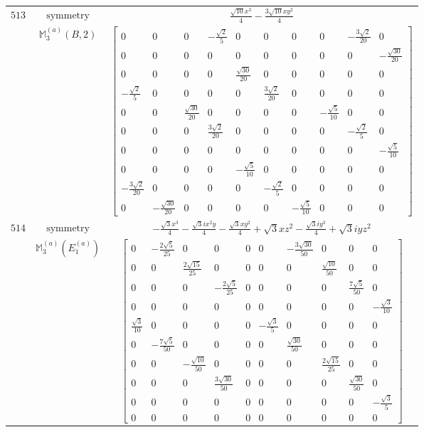 \documentclass[fleqn,8pt,landscape]{jsarticle}
\begin{document}
\begin{longtable}{ccc}
$ 513 $ & $ \text{symmetry} $ & $ \frac{\sqrt{10} x^{3}}{4} - \frac{3 \sqrt{10} x y^{2}}{4} $ \\
$  $ & $ \mathbb{M}_{3}^{(a)}(B,2) $ & $ \begin{bmatrix} 0 & 0 & 0 & - \frac{\sqrt{2}}{5} & 0 & 0 & 0 & 0 & - \frac{3 \sqrt{2}}{20} & 0 \\ 0 & 0 & 0 & 0 & 0 & 0 & 0 & 0 & 0 & - \frac{\sqrt{30}}{20} \\ 0 & 0 & 0 & 0 & \frac{\sqrt{30}}{20} & 0 & 0 & 0 & 0 & 0 \\ - \frac{\sqrt{2}}{5} & 0 & 0 & 0 & 0 & \frac{3 \sqrt{2}}{20} & 0 & 0 & 0 & 0 \\ 0 & 0 & \frac{\sqrt{30}}{20} & 0 & 0 & 0 & 0 & - \frac{\sqrt{5}}{10} & 0 & 0 \\ 0 & 0 & 0 & \frac{3 \sqrt{2}}{20} & 0 & 0 & 0 & 0 & - \frac{\sqrt{2}}{5} & 0 \\ 0 & 0 & 0 & 0 & 0 & 0 & 0 & 0 & 0 & - \frac{\sqrt{5}}{10} \\ 0 & 0 & 0 & 0 & - \frac{\sqrt{5}}{10} & 0 & 0 & 0 & 0 & 0 \\ - \frac{3 \sqrt{2}}{20} & 0 & 0 & 0 & 0 & - \frac{\sqrt{2}}{5} & 0 & 0 & 0 & 0 \\ 0 & - \frac{\sqrt{30}}{20} & 0 & 0 & 0 & 0 & - \frac{\sqrt{5}}{10} & 0 & 0 & 0 \end{bmatrix} $ \\ \hline
$ 514 $ & $ \text{symmetry} $ & $ - \frac{\sqrt{3} x^{3}}{4} - \frac{\sqrt{3} i x^{2} y}{4} - \frac{\sqrt{3} x y^{2}}{4} + \sqrt{3} x z^{2} - \frac{\sqrt{3} i y^{3}}{4} + \sqrt{3} i y z^{2} $ \\
$  $ & $ \mathbb{M}_{3}^{(a)}(E_{1}^{(a)}) $ & $ \begin{bmatrix} 0 & - \frac{2 \sqrt{5}}{25} & 0 & 0 & 0 & 0 & - \frac{3 \sqrt{30}}{50} & 0 & 0 & 0 \\ 0 & 0 & \frac{2 \sqrt{15}}{25} & 0 & 0 & 0 & 0 & \frac{\sqrt{10}}{50} & 0 & 0 \\ 0 & 0 & 0 & - \frac{2 \sqrt{5}}{25} & 0 & 0 & 0 & 0 & \frac{7 \sqrt{5}}{50} & 0 \\ 0 & 0 & 0 & 0 & 0 & 0 & 0 & 0 & 0 & - \frac{\sqrt{3}}{10} \\ \frac{\sqrt{3}}{10} & 0 & 0 & 0 & 0 & - \frac{\sqrt{3}}{5} & 0 & 0 & 0 & 0 \\ 0 & - \frac{7 \sqrt{5}}{50} & 0 & 0 & 0 & 0 & \frac{\sqrt{30}}{50} & 0 & 0 & 0 \\ 0 & 0 & - \frac{\sqrt{10}}{50} & 0 & 0 & 0 & 0 & \frac{2 \sqrt{15}}{25} & 0 & 0 \\ 0 & 0 & 0 & \frac{3 \sqrt{30}}{50} & 0 & 0 & 0 & 0 & \frac{\sqrt{30}}{50} & 0 \\ 0 & 0 & 0 & 0 & 0 & 0 & 0 & 0 & 0 & - \frac{\sqrt{3}}{5} \\ 0 & 0 & 0 & 0 & 0 & 0 & 0 & 0 & 0 & 0 \end{bmatrix} $ \\ \hline

\end{longtable}
\end{document}
